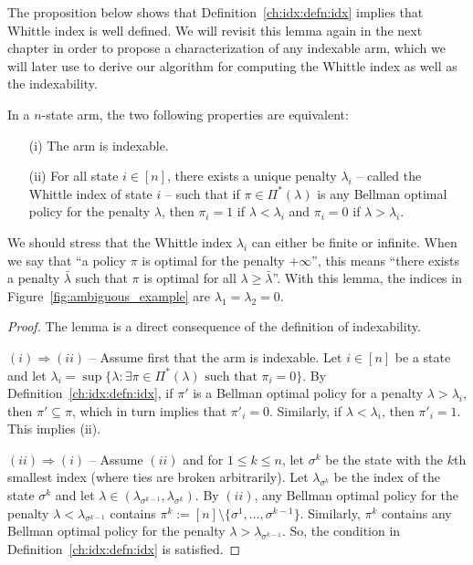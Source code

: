 The proposition below shows that Definition~\ref{ch:idx:defn:idx} implies that Whittle index is well defined.
We will revisit this lemma again in the next chapter in order to propose a characterization of any indexable arm, which we will later use to derive our algorithm for computing the Whittle index as well as the indexability.
\begin{lem}
    \label{ch:idx:lem:idx}
    In a $n$-state arm, the two following properties are equivalent: 
    \begin{enumerate}
        \item[(i)] The arm is indexable.
        \item[(ii)] For all state $i\in[n]$, there exists a unique penalty $\lambda_i$ -- called the Whittle index of state $i$ -- such that if $\pi\in\Pi^*(\lambda)$ is any Bellman optimal policy for the penalty $\lambda$, then $\pi_i=1$ if $\lambda<\lambda_i$ and $\pi_i=0$ if $\lambda>\lambda_i$. 
    \end{enumerate}
\end{lem}

We should stress that the Whittle index $\lambda_i$ can either be finite or infinite. When we say that ``a policy $\pi$ is optimal for the penalty $+\infty$'', this means ``there exists a penalty $\bar{\lambda}$ such that $\pi$ is optimal for all $\lambda\ge\bar{\lambda}$''.
With this lemma, the indices in Figure~\ref{fig:ambiguous_example} are $\lambda_1=\lambda_2=0$.

\begin{proof}
    The lemma is a direct consequence of the definition of indexability.

    $(i)\Rightarrow(ii)$ -- Assume first that the arm is indexable.
    Let $i\in[n]$ be a state and let $\lambda_i=\sup\{\lambda : \exists\pi\in\Pi^*(\lambda)\text{ such that }\pi_i=0\}$.
    By Definition~\ref{ch:idx:defn:idx}, if $\pi'$ is a Bellman optimal policy for a penalty $\lambda>\lambda_i$, then $\pi'\subseteq\pi$, which in turn implies that $\pi'_i=0$.
    Similarly, if $\lambda<\lambda_i$, then $\pi'_i=1$. This implies (ii).

    $(ii)\Rightarrow(i)$ -- Assume $(ii)$ and for $1\le k\le n$, let $\sigma^k$ be the state with the $k$th smallest index (where ties are broken arbitrarily).
    Let $\lambda_{\sigma^k}$ be the index of the state $\sigma^k$ and let $\lambda\in(\lambda_{\sigma^{k-1}}, \lambda_{\sigma^k})$. 
    By $(ii)$, any Bellman optimal policy for the penalty $\lambda<\lambda_{\sigma^{k-1}}$ contains $\pi^{k}:=[n]\setminus\{\sigma^1,\dots, \sigma^{k-1}\}$. Similarly, $\pi^{k}$ contains any Bellman optimal policy for the penalty $\lambda>\lambda_{\sigma^{k-1}}$.
    So, the condition in Definition~\ref{ch:idx:defn:idx} is satisfied.
\end{proof}

